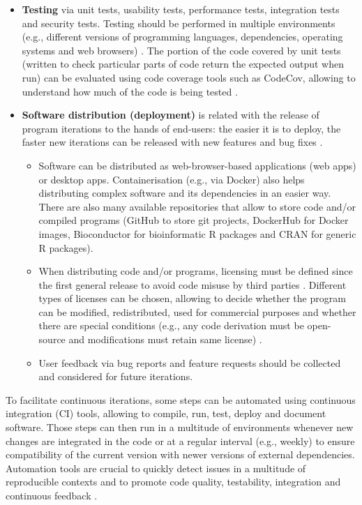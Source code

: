 \begin{itemize}
\begin{itemize}
	\end{itemize}
	\item{\textbf{Testing} via unit tests, usability tests, performance tests, integration tests and security tests. Testing should be performed in multiple environments (e.g., different versions of programming languages, dependencies, operating systems and web browsers) \cite{silva:2017wl,kanat-alexander:2012ve,ford:2021ub}. The portion of the code covered by unit tests (written to check particular parts of code return the expected output when run) can be evaluated using code coverage tools such as CodeCov, allowing to understand how much of the code is being tested \cite{hewitt:2019uj}.}
	\item \textbf{Software distribution (deployment)} is related with the release of program iterations to the hands of end-users: the easier it is to deploy, the faster new iterations can be released with new features and bug fixes \cite{ford:2021ub}.
	\begin{itemize}
		\item Software can be distributed as web-browser-based applications (web apps) or desktop apps. Containerisation (e.g., via Docker) also helps distributing complex software and its dependencies in an easier way. There are also many available repositories that allow to store code and/or compiled programs (GitHub to store git projects, DockerHub for Docker images, Bioconductor for bioinformatic R packages \cite{huber:2015wt} and CRAN for generic R packages).
		\item When distributing code and/or programs, licensing must be defined since the first general release to avoid code misuse by third parties \cite{silva:2017wl}. Different types of licenses can be chosen, allowing to decide whether the program can be modified, redistributed, used for commercial purposes and whether there are special conditions (e.g., any code derivation must be open-source and modifications must retain same license) \cite{silva:2017wl}.
		\item User feedback via bug reports and feature requests should be collected and considered for future  iterations.
	\end{itemize}
\end{itemize}

To facilitate continuous iterations, some steps can be automated using continuous integration (CI) tools, allowing to compile, run, test, deploy and document software. Those steps can then run in a multitude of environments whenever new changes are integrated in the code or at a regular interval (e.g., weekly) to ensure compatibility of the current version with newer versions of external dependencies. Automation tools are crucial to quickly detect issues in a multitude of reproducible contexts and to promote code quality, testability, integration and continuous feedback \cite{silva:2017wl,hewitt:2019uj,ford:2021ub,storer:2017tr}.

